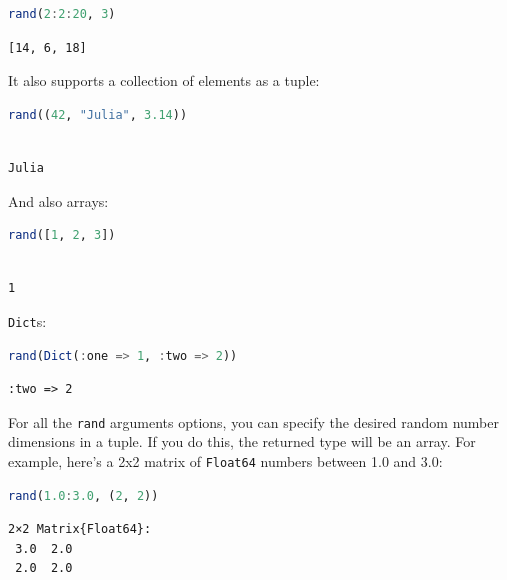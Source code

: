 \documentclass[
  notoc %
]{tufte-book}
\newcommand{\passthrough}[1]{#1}
\begin{document}
\begin{lstlisting}[language=Julia]
rand(2:2:20, 3)
\end{lstlisting}

\begin{lstlisting}[language=Output]
[14, 6, 18]
\end{lstlisting}

It also supports a collection of elements as a tuple:

\begin{lstlisting}[language=Julia]
rand((42, "Julia", 3.14))
\end{lstlisting}

\begin{lstlisting}[language=Output]

Julia

\end{lstlisting}

And also arrays:

\begin{lstlisting}[language=Julia]
rand([1, 2, 3])
\end{lstlisting}

\begin{lstlisting}[language=Output]

1

\end{lstlisting}

\passthrough{\lstinline!Dict!}s:

\begin{lstlisting}[language=Julia]
rand(Dict(:one => 1, :two => 2))
\end{lstlisting}

\begin{lstlisting}[language=Output]
:two => 2
\end{lstlisting}

For all the \passthrough{\lstinline!rand!} arguments options, you can
specify the desired random number dimensions in a tuple. If you do this,
the returned type will be an array. For example, here's a 2x2 matrix of
\passthrough{\lstinline!Float64!} numbers between 1.0 and 3.0:

\begin{lstlisting}[language=Julia]
rand(1.0:3.0, (2, 2))
\end{lstlisting}

\begin{lstlisting}[language=Output]
2×2 Matrix{Float64}:
 3.0  2.0
 2.0  2.0
\end{lstlisting}
\end{document}
